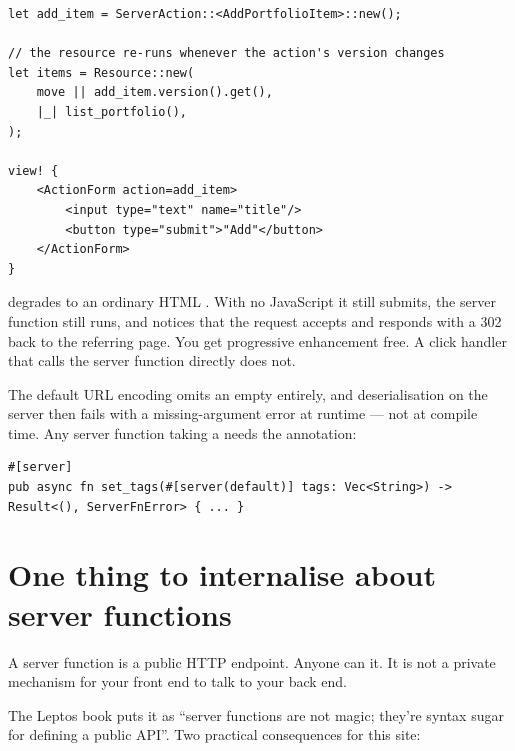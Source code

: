 \begin{lstlisting}[style=rs,caption={A write, and the read that refreshes itself when the write lands.}]
let add_item = ServerAction::<AddPortfolioItem>::new();

// the resource re-runs whenever the action's version changes
let items = Resource::new(
    move || add_item.version().get(),
    |_| list_portfolio(),
);

view! {
    <ActionForm action=add_item>
        <input type="text" name="title"/>
        <button type="submit">"Add"</button>
    </ActionForm>
}
\end{lstlisting}

\begin{why}
 degrades to an ordinary HTML . With no JavaScript it
still submits, the server function still runs, and  notices that the request
accepts  and responds with a 302 back to the referring page. You get progressive
enhancement free. A click handler that calls the server function directly does not.
\end{why}

\begin{pitfall}
The default URL encoding omits an empty  entirely, and deserialisation on the server then
fails with a missing-argument error at runtime --- not at compile time. Any server function taking
a  needs the annotation:
\begin{lstlisting}[style=rs]
#[server]
pub async fn set_tags(#[server(default)] tags: Vec<String>) -> Result<(), ServerFnError> { ... }
\end{lstlisting}
\end{pitfall}

\section{One thing to internalise about server functions}

\begin{keyidea}
A server function is a public HTTP endpoint. Anyone can  it. It is not a private
mechanism for your front end to talk to your back end.
\end{keyidea}

The Leptos book puts it as ``server functions are not magic; they're syntax sugar for defining a
public API''. Two practical consequences for this site:

